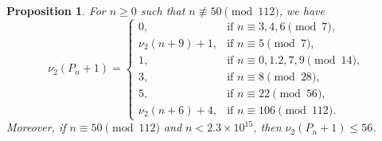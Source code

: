 \documentclass[11pt,a4paper]{article}
\newtheorem{proposition}[theorem]{Proposition}
\numberwithin{equation}{section}
\numberwithin{table}{section}
\numberwithin{figure}{section}
\begin{document}
\begin{proposition}\label{prop:Pn}
	For $n\ge 0$ such that $n\not\equiv 50\pmod{112}$, we have
	\begin{equation*}
		\nu_{2}(P_{n}+1)= 
		\begin{cases}
			0, & \text{if } n\equiv 3,4,6\pmod{7},\\
		\nu_{2}(n+9)+1, & \text{if } n\equiv 5\pmod{7},\\
			1, & \text{if } n\equiv 0,1.2,7,9\pmod{14},\\
			3, & \text{if } n\equiv 8\pmod{28},\\
			5, & \text{if } n\equiv 22\pmod{56},\\
			\nu_{2}(n+6)+4, & \text{if } n\equiv 106\pmod{112}.
		\end{cases}
	\end{equation*}
	Moreover, if $n\equiv 50\pmod{112}$ and $n<2.3\times 10^{15}$, 
	then $\nu_{2}(P_{n}+1)\le 56$.
\end{proposition}
\end{document}
